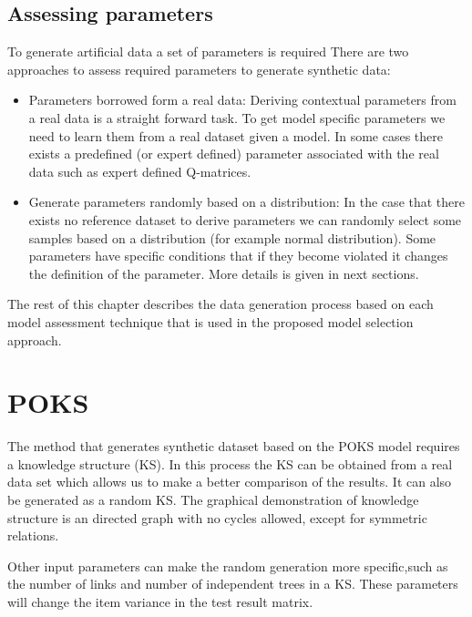 \subsection{Assessing parameters}

To generate artificial data a set of parameters is required There are two approaches to assess required parameters to generate synthetic data:
\begin{itemize}
\item Parameters borrowed form a real data: Deriving contextual parameters from a real data is a straight forward task. To get model specific parameters we need to learn them from a real dataset given a model. In some cases there exists a predefined (or expert defined) parameter associated with the real data such as expert defined Q-matrices.
\item Generate parameters randomly based on a distribution: In the case that there exists no reference dataset to derive parameters we can randomly select some samples based on a distribution (for example normal distribution). Some parameters have specific conditions that if they become violated it changes the definition of the parameter. More details is given in next sections.

\end{itemize}

The rest of this chapter describes the data generation process based on each model assessment technique that is used in the proposed model selection approach.

\section{POKS}

The method that generates synthetic dataset based on the POKS model requires a knowledge structure (KS). In this process the KS can be obtained from a real data set which allows us to make a better comparison of the results. It can also be generated as a random KS. The graphical demonstration of knowledge structure is an directed graph with no cycles allowed, except for symmetric relations.  

Other input parameters can make the random generation more specific,such as the number of links and number of independent trees in a KS. These parameters will change the item variance in the test result matrix. 

